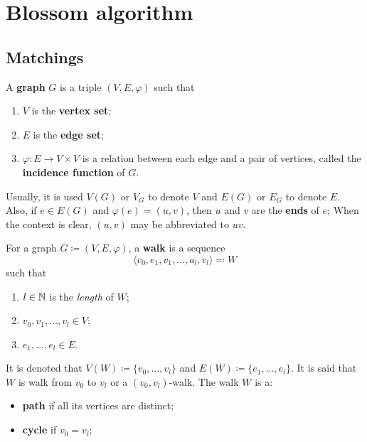 \chapter{Blossom algorithm}

\enlargethispage{.5\baselineskip}

\section{Matchings}

\begin{definition}[Graph]
	\label{def:graph}
	A \textbf{graph} \(G\) is a triple \((V, E, \varphi)\) such that
	\begin{enumerate}[label=(\roman*)]
		\item \(V\) is the \textbf{vertex set};
		\item \(E\) is the \textbf{edge set};
		\item \(\varphi: E \to V \times V\) is a relation between each edge and a pair of vertices, called the \textbf{incidence function} of \(G\).
	\end{enumerate}
	Usually, it is used 
	\(V(G)\) or \(V_G\) to denote \(V\) and 
	\(E(G)\) or \(E_G\) to denote \(E\).
	Also, if \(e \in E(G)\) and \(\varphi(e) = (u, v)\), then \(u\) and \(v\) are the \textbf{ends} of \(e\);
	When the context is clear, \((u, v)\) may be abbreviated to \(uv\).
\end{definition}

\begin{definition}[Walk]
	\label{def:walk}
	For a graph \(G \coloneqq (V, E, \varphi)\), a \textbf{walk} is a sequence
	\[
		\langle v_0, e_1, v_1, \dots, a_l, v_l \rangle \eqqcolon W
	\]
	such that
	\begin{enumerate}[label=(\roman*)]
		\item \(l \in \mathbb{N}\) is the \textit{length} of \(W\);
		\item \(v_0, v_1, \dots, v_l \in V\);
		\item \(e_1, \dots, e_l \in E\).
	\end{enumerate}
	It is denoted that \(V(W) 
	\coloneqq \{v_0, \dots, v_l\}\) 
	and 
	\(E(W) \coloneqq \{e_1, \dots, e_l\}\). 
	It is said that \(W\) is walk from \(v_0\) to \(v_l\) or a \((v_0, v_l)\)-walk.
	The walk \(W\) is a:
	\begin{itemize}
		\item 
			\textbf{path} if all its vertices are distinct;
		\item 
			\textbf{cycle} if \(v_0 = v_l\);
	\end{itemize}
\end{definition}


